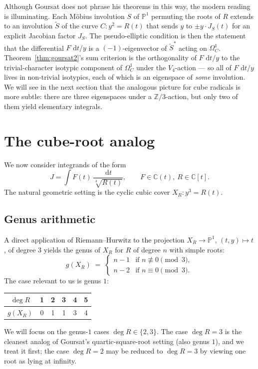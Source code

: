 \documentclass[11pt,a4paper]{article}
\theoremstyle{plain}
\theoremstyle{definition}
\theoremstyle{remark}
\newcommand{\C}{\mathbb{C}}
\newcommand{\Z}{\mathbb{Z}}
\renewcommand{\d}{\,\mathrm{d}}
\begin{document}
Although Goursat does not phrase his theorems in this way, the modern reading is illuminating. Each M\"obius involution $S$ of $\mathbb{P}^1$ permuting the roots of $R$ extends to an involution $\widetilde{S}$ of the curve $C \colon y^2 = R(t)$ that sends $y$ to $\pm y \cdot J_S(t)$ for an explicit Jacobian factor $J_S$. The pseudo-elliptic condition is then the statement that the differential $F\,\d t/y$ is a $(-1)$-eigenvector of $\widetilde{S}^*$ acting on $\Omega^1_C$. Theorem~\ref{thm:goursat2}'s sum criterion is the orthogonality of $F\,\d t/y$ to the trivial-character isotypic component of $\Omega^1_C$ under the $V_4$-action --- so all of $F\,\d t/y$ lives in non-trivial isotypics, each of which is an eigenspace of \emph{some} involution.\\

We will see in the next section that the analogous picture for cube radicals is more subtle: there are three eigenspaces under a $\Z/3$-action, but only two of them yield elementary integrals.


\section{The cube-root analog}
\label{sec:cuberoot}

We now consider integrands of the form
\begin{equation}\label{eq:cuberoot-integrand}
  J = \int F(t)\,\frac{\d t}{\sqrt[3]{R(t)}}, \qquad F\in\C(t),\ R\in\C[t].
\end{equation}
The natural geometric setting is the cyclic cubic cover $X_R \colon y^3 = R(t)$.

\subsection{Genus arithmetic}

A direct application of Riemann--Hurwitz to the projection $X_R\to\mathbb{P}^1$, $(t,y)\mapsto t$, of degree $3$ yields the genus of $X_R$ for $R$ of degree $n$ with simple roots:
\[
  g(X_R) \;=\;
  \begin{cases}
    n-1 & \text{if } n\not\equiv 0\pmod 3, \\
    n-2 & \text{if } n\equiv 0\pmod 3.
  \end{cases}
\]
The case relevant to us is genus $1$:
\begin{center}
\begin{tabular}{c|ccccc}
  $\deg R$ & 1 & 2 & 3 & 4 & 5 \\\hline
  $g(X_R)$ & 0 & 1 & 1 & 3 & 4
\end{tabular}
\end{center}
We will focus on the genus-$1$ cases $\deg R\in\{2,3\}$. The case $\deg R=3$ is the cleanest analog of Goursat's quartic-square-root setting (also genus $1$), and we treat it first; the case $\deg R = 2$ may be reduced to $\deg R = 3$ by viewing one root as lying at infinity.
\end{document}
